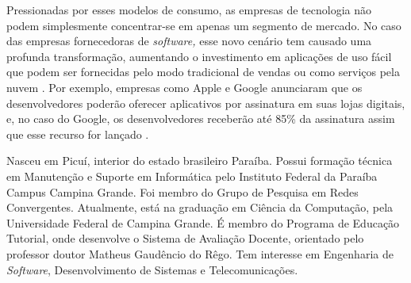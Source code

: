 \documentclass{classe_cn}                 %
\begin{document}
Pressionadas por esses modelos de consumo, as empresas de tecnologia não podem simplesmente concentrar-se em apenas um segmento de mercado. No caso das empresas fornecedoras de \textit{software,} esse novo cenário tem causado uma profunda transformação, aumentando o investimento em aplicações de uso fácil que podem ser fornecidas pelo modo tradicional de vendas ou como serviços pela nuvem \cite{Tadeu}. Por exemplo, empresas como Apple e Google anunciaram que os desenvolvedores poderão oferecer aplicativos por assinatura em suas lojas digitais, e, no caso do Google, os desenvolvedores receberão até 85\% da assinatura assim que esse recurso for lançado \cite{Giz}.



\vspace{1.0cm}
  Nasceu em Picuí, interior do estado brasileiro Paraíba. Possui formação técnica em Manutenção e Suporte em Informática pelo Instituto Federal da Paraíba Campus Campina Grande. Foi membro do Grupo de Pesquisa em Redes Convergentes. Atualmente, está na graduação em Ciência da Computação, pela Universidade Federal de Campina Grande. É membro do Programa de Educação Tutorial, onde desenvolve o Sistema de Avaliação Docente, orientado pelo professor doutor Matheus Gaudêncio do Rêgo. Tem interesse em Engenharia de \textit{Software}, Desenvolvimento de Sistemas e Telecomunicações.  
\end{document}
